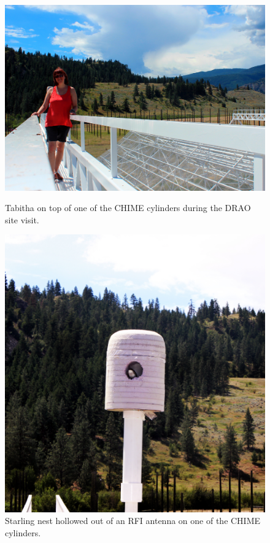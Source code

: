 \begin{figure}[htb]
\centering
\begin{minipage}[b]{0.59\textwidth}
\centering
\includegraphics[width=0.95\linewidth]{Planetarium/figures/Filming_at_CHIME.jpg}
\caption{Tabitha on top of one of the CHIME cylinders during the DRAO site visit. }
\label{Fig:CHIME_film}
\end{minipage}%
\begin{minipage}[b]{0.02\textwidth}
\hspace{1cm}
\end{minipage}%
\begin{minipage}[b]{0.37\textwidth}
\centering
\includegraphics[width=0.95\linewidth]{Planetarium/figures/CHIME_birdsnest.jpg}
\caption{Starling nest hollowed out of an RFI antenna on one of the CHIME cylinders.}
\label{Fig:CHIME_bird}
\end{minipage}
\end{figure}

